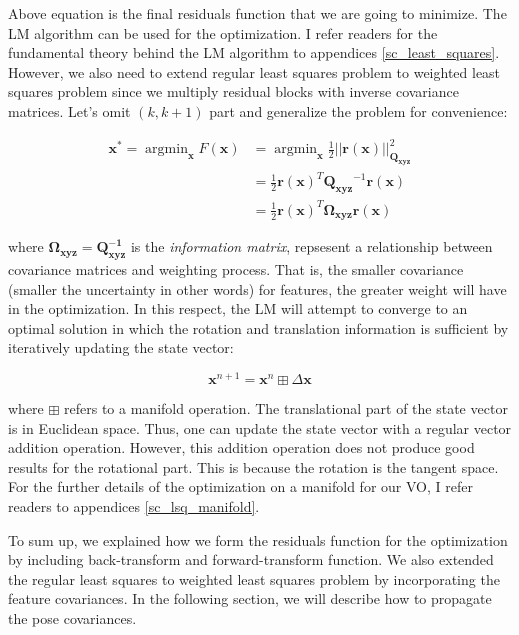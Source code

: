 \documentclass[a4paper]{report}
\numberwithin{figure}{section}
\newcommand{\argmin}{\mathop{\mathrm{argmin}}}
\begin{document}
Above equation is the final residuals function that we are going to minimize.
The LM algorithm can be used for the optimization. I refer readers for the
fundamental theory behind the LM algorithm to appendices
\ref{sc_least_squares}.  However, we also need to extend regular least squares
problem to weighted least squares problem since we multiply residual blocks
with inverse covariance matrices.  Let's omit $(k,k+1)$ part and generalize the
problem for convenience:

\begin{equation} \begin{aligned} \mathbf{x}^* = \argmin_{\mathbf{x}}
F(\mathbf{x}) & = \argmin_{\mathbf{x}} \frac{1}{2}
||\mathbf{r}(\mathbf{x})||^2_{\mathbf{Q_{xyz}}} \\ & = \frac{1}{2}
\mathbf{r}(\mathbf{x})^T \mathbf{Q_{xyz}}^{-1} \mathbf{r}(\mathbf{x}) \\ & =
\frac{1}{2} \mathbf{r}(\mathbf{x})^T \mathbf{\Omega}_{\mathbf{xyz}}
\mathbf{r}(\mathbf{x}) \end{aligned}
\end{equation}\label{eq:residuals_objective}

where $\mathbf{\Omega_{xyz} = Q^{-1}_{xyz}}$ is the \textit{information
matrix}, repsesent a relationship between covariance matrices and weighting
process.  That is, the smaller covariance (smaller the uncertainty in other
words) for features, the greater weight will have in the optimization.  In this
respect, the LM will attempt to converge to an optimal solution in which the
rotation and translation information is sufficient by iteratively updating the
state vector:

\begin{equation} \mathbf{x}^{n+1} = \mathbf{x}^{n} \boxplus \Delta \mathbf{x}
\end{equation}

where $\boxplus$ refers to a manifold operation.  The translational part of the
state vector is in Euclidean space. Thus, one can update the state vector with
a regular vector addition operation.  However, this addition operation does not
produce good results for the rotational part. This is because the rotation is
the tangent space.  For the further details of the optimization on a manifold
for our VO, I refer readers to appendices \ref{sc_lsq_manifold}.

To sum up, we explained how we form the residuals function for the optimization
by including back-transform and forward-transform function. We also extended
the regular least squares to weighted least squares problem by incorporating
the feature covariances. In the following section, we will describe how to
propagate the pose covariances.
\end{document}
